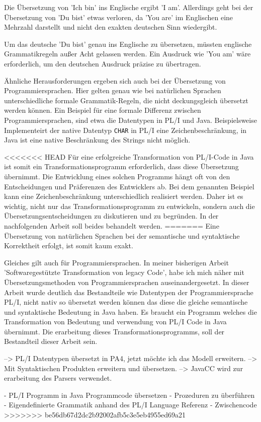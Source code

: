 Die Übersetzung von 'Ich bin' ins Englische ergibt 'I am'. Allerdings geht bei der Übersetzung von 'Du bist' etwas verloren, da 'You are' im Englischen eine Mehrzahl darstellt und nicht den exakten deutschen Sinn wiedergibt.

Um das deutsche 'Du bist' genau ins Englische zu übersetzen, müssten englische Grammatikregeln außer Acht gelassen werden. Ein Ausdruck wie 'You am' wäre erforderlich, um den deutschen Ausdruck präzise zu übertragen.

Ähnliche Herausforderungen ergeben sich auch bei der Übersetzung von Programmiersprachen. Hier gelten genau wie bei natürlichen Sprachen unterschiedliche formale Grammatik-Regeln, die nicht deckungsgleich übersetzt werden können. Ein Beispiel für eine formale Differenz zwischen Programmiersprachen, sind etwa die Datentypen in PL/I und Java. Beispielsweise Implementeirt der native Datentyp \verb!CHAR! in PL/I eine Zeichenbeschränkung, in Java ist eine native Beschränkung des Strings nicht möglich. 

<<<<<<< HEAD
Für eine erfolgreiche Transformation von PL/I-Code in Java ist somit ein Transformationsprogramm erforderlich, dass diese Übersetzung übernimmt. Die Entwicklung eines solchen Programms hängt oft von den Entscheidungen und Präferenzen des Entwicklers ab. Bei dem genannten Beispiel kann eine Zeichenbeschränkung unterschiedlich realisiert werden. Daher ist es wichtig, nicht nur das Transformationsprogramm zu entwickeln, sondern auch die Übersetzungsentscheidungen zu diskutieren und zu begründen. In der nachfolgenden Arbeit soll beides behandelt werden.
=======
Eine Übersetzung von natürlichen Sprachen bei der semantische und syntaktische Korrektheit erfolgt, ist somit kaum exakt.

Gleiches gilt auch für Programmiersprachen. In meiner bisherigen Arbeit 'Softwaregestützte Transformation von legacy Code', habe ich mich näher mit Übersetzungsmethoden von Programmiersprachen auseinandergesetzt. In dieser Arbeit wurde deutlich das Bestandteile wie Datentypen der Programmiersprache PL/I, nicht nativ so übersetzt werden können das diese die gleiche semantische und syntaktische Bedeutung in Java haben. Es braucht ein Programm welches die Transformation von Bedeutung und verwendung von PL/I Code in Java übernimmt. Die erarbeitung dieses Transformationsprogramms, soll der Bestandteil dieser Arbeit sein.

--> PL/I Datentypen übersetzt in PA4, jetzt möchte ich das Modell erweitern. 
--> Mit Syntaktischen Produkten erweitern und übersetzen.
--> JavaCC wird zur erarbeitung des Parsers verwendet.

- PL/I Programm in Java Programmcode übersetzen
- Prozeduren zu überführen
- Eigendefinierte Grammatik anhand des PL/I Language Referenz
- Zwischencode 
>>>>>>> be56db67d2dc2b92002afb5c3e5eb4955ed69a21
